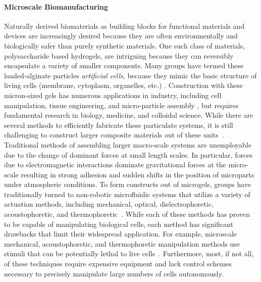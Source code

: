 \paragraph{Microscale Biomanufacturing}
Naturally derived biomaterials as building blocks for functional materials and devices are increasingly desired because they are often environmentally and biologically safer than purely synthetic materials. 
One such class of materials, polysaccharide based hydrogels, are intriguing because they can reversibly encapsulate a variety of smaller components. Many groups have termed these loaded-alginate particles  \emph{artificial cells}, because they mimic the basic structure of living cells (membrane, cytoplasm, organelles, etc.) \cite{chang2005therapeutic,prakash2007artificial,chang2007artificial}. 
Construction with these micron-sized gels has numerous applications in industry, including cell manipulation, tissue engineering, and micro-particle assembly \cite{weibel2007microfabrication,abbott2007robotics,yi2006microfluidics,castillo2009manipulation,sitti2015biomedical}, but requires fundamental research in biology, medicine, and colloidal science. 
While there are several methods to efficiently fabricate these particulate systems, it is still challenging to construct larger composite materials out of these units~\cite{assal2015highlights}. Traditional methods of assembling larger macro-scale systems are unemployable due to the change of dominant forces at small length scales. 
In particular, forces due to electromagnetic interactions dominate gravitational forces at the micro-scale resulting in strong adhesion and sudden shifts in the position of microparts under atmospheric conditions. 
To form constructs out of microgels, groups have traditionally turned to non-robotic microfluidic systems that utilize a variety of actuation methods, including mechanical, optical, dielectrophoretic, acoustophoretic, and thermophoretic~\cite{desai2007engineering, chiou2005massively,shields2015microfluidic,augustsson2009decomplexing,vigolo2010thermophoresis}. 
While each of these methods has proven to be capable of manipulating biological cells, each method has significant drawbacks that limit their widespread application. 
For example, microscale mechanical, acoustophoretic, and thermophoretic manipulation methods use stimuli that can be potentially lethal to live cells~\cite{lin2012application}. 
Furthermore, most, if not all, of these techniques require expensive equipment and lack control schemes necessary to precisely manipulate large numbers of cells autonomously.

